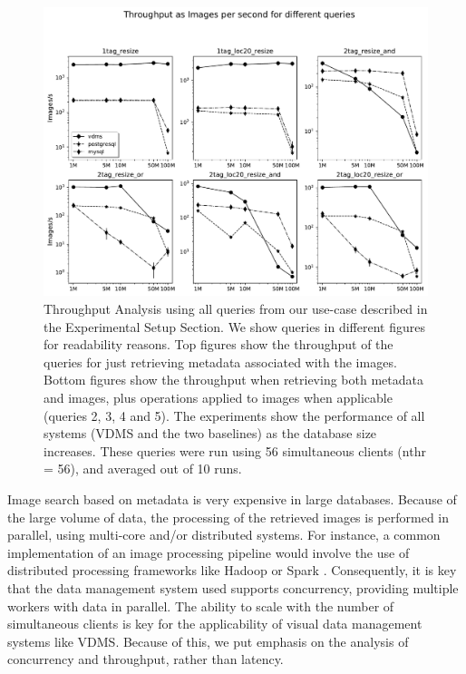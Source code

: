 \begin{figure}[ht]
\includegraphics[width=\textwidth]{figures/plot_th_56_mosaic_results_throughput}
\caption{Throughput Analysis using all queries from our use-case
described in the Experimental Setup Section.
We show queries in different figures for readability reasons.
Top figures show the throughput of the queries for
just retrieving metadata associated with the images.
Bottom figures show the throughput when retrieving both metadata and images,
plus operations applied to images when applicable (queries 2, 3, 4 and 5).
The experiments show the performance of all systems (VDMS and the two baselines) as the
database size increases.
These queries were run using 56 simultaneous clients (nthr = 56),
and averaged out of 10 runs.}
\label{fig:q_throughput_56}
\end{figure}

Image search based on metadata is very expensive in large databases.
Because of the large volume of data, the processing of the retrieved images
is performed in parallel, using multi-core and/or distributed systems.
For instance, a common implementation of an image processing pipeline
would involve the use of distributed processing frameworks
like Hadoop \cite{hadoop} or Spark \cite{spark}.
Consequently, it is key that the data management system used supports
concurrency, providing multiple workers with data in parallel.
The ability to scale with the number of simultaneous clients is key for the
applicability of visual data management systems like VDMS.
Because of this, we put emphasis on the analysis of concurrency and throughput,
rather than latency.

